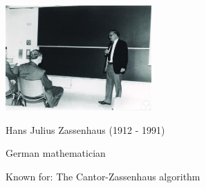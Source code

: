 \begin{frame}
\hfil\hfil \includegraphics[height=4cm]{../../modules/history/pictures/zassenhaus.jpg}

\hfil\hfil Hans Julius Zassenhaus (1912 - 1991)

\hfil\hfil German mathematician

\hfil\hfil Known for: The Cantor-Zassenhaus algorithm


\end{frame}